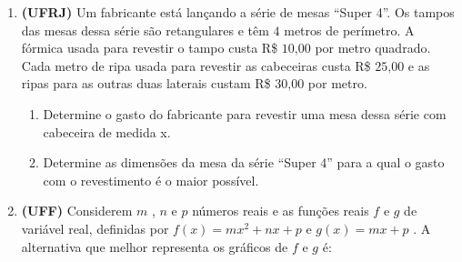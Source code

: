 \begin{enumerate}
\label{\detokenize{AF209-E:sec-funcao-quadratica-exercicios}}\label{\detokenize{AF209-E:exercicios}}\label{\detokenize{AF209-E::doc}}
\item \textbf{(UFRJ)} Um fabricante está lançando a série de mesas  “Super 4”. Os tampos das mesas dessa série são retangulares e têm \(4\) metros de perímetro. A fórmica usada para revestir o tampo custa R\$ $10\text{,}00$ por metro quadrado. Cada metro de ripa usada para revestir as cabeceiras custa R\$ $25\text{,}00$ e as ripas para as outras duas laterais custam R\$ $30\text{,}00$ por metro.
\begin{center}\end{center}\begin{enumerate}
\item {} 
Determine o gasto do fabricante para revestir uma mesa dessa série com cabeceira de medida x.

\item {} 
Determine as dimensões da mesa da série “Super 4” para a qual o gasto com o revestimento é o maior possível.

\end{enumerate}

\needspace{10em}
\item \textbf{(UFF)} Considerem  \(m\) , \(n\)  e  \(p\)  números reais e as funções reais  \(f\)  e  \(g\)  de variável real, definidas por \(f(x)= mx^2+nx+p\)   e   \(g(x) = mx + p\) .  A alternativa que melhor representa os gráficos de  \(f\)  e  \(g\) é:


\end{enumerate}
